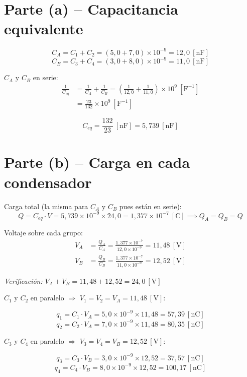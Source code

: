 \documentclass[12pt,letterpaper]{article}
\begin{document}
\section*{Parte (a) -- Capacitancia equivalente}

\[
    C_A = C_1 + C_2 = (5{,}0 + 7{,}0)\times10^{-9} = 12{,}0\ [\text{nF}]
\]
\[
    C_B = C_3 + C_4 = (3{,}0 + 8{,}0)\times10^{-9} = 11{,}0\ [\text{nF}]
\]

$C_A$ y $C_B$ en serie:
\begin{align*}
    \frac{1}{C_{eq}} &= \frac{1}{C_A} + \frac{1}{C_B}
                      = \left(\frac{1}{12{,}0} + \frac{1}{11{,}0}\right)\times10^{9}\ [\text{F}^{-1}]\\[6pt]
                     &= \frac{23}{132}\times10^{9}\ [\text{F}^{-1}]
\end{align*}

\[
    \boxed{C_{eq} = \frac{132}{23}\ [\text{nF}] = 5{,}739\ [\text{nF}]}
\]

\section*{Parte (b) -- Carga en cada condensador}

Carga total (la misma para $C_A$ y $C_B$ pues est\'an en serie):
\[
    Q = C_{eq}\cdot V = 5{,}739\times10^{-9}\times24{,}0 = 1{,}377\times10^{-7}\ [\text{C}]
    \implies Q_A = Q_B = Q
\]

Voltaje sobre cada grupo:
\begin{align*}
    V_A &= \frac{Q_A}{C_A} = \frac{1{,}377\times10^{-7}}{12{,}0\times10^{-9}} = 11{,}48\ [\text{V}]\\[6pt]
    V_B &= \frac{Q_B}{C_B} = \frac{1{,}377\times10^{-7}}{11{,}0\times10^{-9}} = 12{,}52\ [\text{V}]
\end{align*}

\noindent\textit{Verificaci\'on:} $V_A + V_B = 11{,}48 + 12{,}52 = 24{,}0\ [\text{V}]$ \checkmark

\medskip
$C_1$ y $C_2$ en paralelo $\Rightarrow$ $V_1 = V_2 = V_A = 11{,}48\ [\text{V}]$:

\[
    \boxed{q_1 = C_1\cdot V_A = 5{,}0\times10^{-9}\times 11{,}48 = 57{,}39\ [\text{nC}]}
\]
\[
    \boxed{q_2 = C_2\cdot V_A = 7{,}0\times10^{-9}\times 11{,}48 = 80{,}35\ [\text{nC}]}
\]

$C_3$ y $C_4$ en paralelo $\Rightarrow$ $V_3 = V_4 = V_B = 12{,}52\ [\text{V}]$:

\[
    \boxed{q_3 = C_3\cdot V_B = 3{,}0\times10^{-9}\times 12{,}52 = 37{,}57\ [\text{nC}]}
\]
\[
    \boxed{q_4 = C_4\cdot V_B = 8{,}0\times10^{-9}\times 12{,}52 = 100{,}17\ [\text{nC}]}
\]
\end{document}
